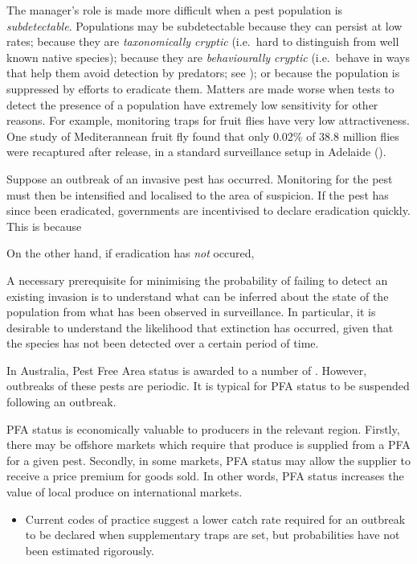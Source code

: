 \documentclass[
]{book}
\providecommand{\tightlist}{%
  \setlength{\itemsep}{0pt}\setlength{\parskip}{0pt}}
\begin{document}
The manager's role is made more difficult when a pest population is \emph{subdetectable}. Populations may be subdetectable because they can persist at low rates; because they are \emph{taxonomically cryptic} (i.e.~hard to distinguish from well known native species); because they are \emph{behaviourally cryptic} (i.e.~behave in ways that help them avoid detection by predators; see \citet{kery2002}); or because the population is suppressed by efforts to eradicate them. Matters are made worse when tests to detect the presence of a population have extremely low sensitivity for other reasons. For example, monitoring traps for fruit flies have very low attractiveness. One study of Mediterannean fruit fly found that only 0.02\% of 38.8 million flies were recaptured after release, in a standard surveillance setup in Adelaide (\citet{ms2007}).

Suppose an outbreak of an invasive pest has occurred. Monitoring for the pest must then be intensified and localised to the area of suspicion. If the pest has since been eradicated, governments are incentivised to declare eradication quickly. This is because

On the other hand, if eradication has \emph{not} occured,

A necessary prerequisite for minimising the probability of failing to detect an existing invasion is to understand what can be inferred about the state of the population from what has been observed in surveillance. In particular, it is desirable to understand the likelihood that extinction has occurred, given that the species has not been detected over a certain period of time.

In Australia, Pest Free Area status is awarded to a number of . However, outbreaks of these pests are periodic. It is typical for PFA status to be suspended following an outbreak.

PFA status is economically valuable to producers in the relevant region. Firstly, there may be offshore markets which require that produce is supplied from a PFA for a given pest. Secondly, in some markets, PFA status may allow the supplier to receive a price premium for goods sold. In other words, PFA status increases the value of local produce on international markets.

\begin{itemize}
\tightlist
\item
  Current codes of practice suggest a lower catch rate required for an outbreak to be declared when supplementary traps are set, but probabilities have not been estimated rigorously.
\end{itemize}
\end{document}
